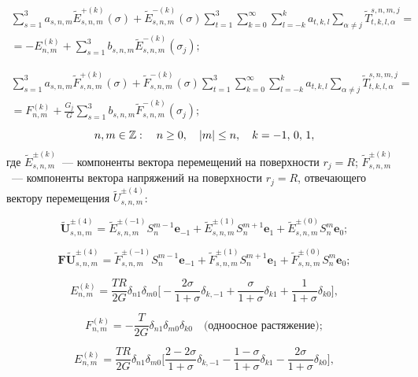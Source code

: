 \begin{multline}
\sum\limits_{s=1}^3 a_{s,n,m}\tilde E_{s,n,m}^{+(k)}(\sigma)+\tilde E_{s,n,m}^{-(k)}(\sigma)\sum\limits_{t=1}^3\sum\limits_{k=0}^\infty\sum\limits_{l=-k}^k a_{t,k,l}\sum\limits_{\alpha\neq j}\tilde T_{t,k,l,\alpha}^{s,n,m,j}= \\
=-E_{n,m}^{(k)}+\sum\limits_{s=1}^3 b_{s,n,m}\tilde E_{s,n,m}^{-(k)}(\sigma_j);
\label{eq:11:28}
\end{multline}

\begin{multline}
\sum\limits_{s=1}^3 a_{s,n,m}\tilde F_{s,n,m}^{+(k)}(\sigma)+\tilde F_{s,n,m}^{-(k)}(\sigma)\sum\limits_{t=1}^3\sum\limits_{k=0}^\infty\sum\limits_{l=-k}^k a_{t,k,l}\sum\limits_{\alpha\neq j}\tilde T_{t,k,l,\alpha}^{s,n,m,j}= \\
=F_{n,m}^{(k)}+\frac{G_j}{G}\sum\limits_{s=1}^3 b_{s,n,m}\tilde F_{s,n,m}^{-(k)}(\sigma_j);
\label{eq:11:29}
\end{multline}
$$
n,m \in\mathbb{Z} :\quad n \ge 0,\quad |m| \le n,\quad k =  - 1,{\mkern 1mu} {\kern 1pt} 0,{\mkern 1mu} {\kern 1pt} 1,
$$
где $\tilde E_{s,n,m}^{\pm(k)}$~--- компоненты вектора перемещений на поверхности $r_j=R$; $\tilde F_{s,n,m}^{\pm(k)}$~--- компоненты вектора напряжений на поверхности $r_j=R$, отвечающего вектору перемещения $\tilde U_{s,n,m}^{\pm(4)}$:

$$
\mathbf{\tilde U}_{s,n,m}^{\pm(4)}=\tilde E_{s,n,m}^{\pm(-1)}S_n^{m-1}\mathbf{e}_{-1}+\tilde E_{s,n,m}^{\pm(1)}S_n^{m+1}\mathbf{e}_1+\tilde E_{s,n,m}^{\pm(0)}S_n^m\mathbf{e}_0;
$$

$$
\mathbf{F\tilde U}_{s,n,m}^{\pm(4)}=\tilde F_{s,n,m}^{\pm(-1)}S_n^{m-1}\mathbf{e}_{-1}+\tilde F_{s,n,m}^{\pm(1)}S_n^{m+1}\mathbf{e}_1+\tilde F_{s,n,m}^{\pm(0)}S_n^m\mathbf{e}_0;
$$

\begin{equation*}
E_{n,m}^{(k)} =\frac{TR}{2G}\delta_{n1}\delta_{m0}\bigg[-\frac{2\sigma}{1+\sigma}\delta_{k,-1}+\frac{\sigma}{1+\sigma}\delta_{k1}+\frac{1}{1+\sigma}\delta_{k0}\bigg],
\label{eq:11:19a}
\end{equation*}

\begin{equation*}
F_{n,m}^{(k)} =  -\frac{T}{2G}{\delta _{n1}}{\delta _{m0}}{\delta _{k0}}\quad\text{(одноосное растяжение)};
\label{eq:11:19}
\end{equation*}

\begin{equation*}
E_{n,m}^{(k)} =\frac{TR}{2G}\delta_{n1}\delta_{m0}\bigg[\frac{2-2\sigma}{1+\sigma}\delta_{k,-1}-\frac{1-\sigma}{1+\sigma}\delta_{k1}-\frac{2\sigma}{1+\sigma}\delta_{k0}\bigg],
\label{eq:11:20a}
\end{equation*}


